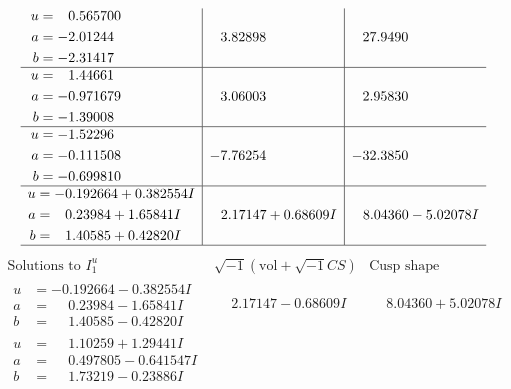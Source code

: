 \documentclass[1p]{elsarticle_modified}
\theoremstyle{definition}
\newcommand{\I}{\sqrt{-1}}
\begin{document}
$$\begin{array}{c|c|c}
\begin{aligned}
u &= \phantom{-}0.565700\phantom{ +0.000000I} \\
a &= -2.01244\phantom{ +0.000000I} \\
b &= -2.31417\phantom{ +0.000000I}\end{aligned}
 & \phantom{-}3.82898\phantom{ +0.000000I} & \phantom{-}27.9490\phantom{ +0.000000I} \\ \hline\begin{aligned}
u &= \phantom{-}1.44661\phantom{ +0.000000I} \\
a &= -0.971679\phantom{ +0.000000I} \\
b &= -1.39008\phantom{ +0.000000I}\end{aligned}
 & \phantom{-}3.06003\phantom{ +0.000000I} & \phantom{-}2.95830\phantom{ +0.000000I} \\ \hline\begin{aligned}
u &= -1.52296\phantom{ +0.000000I} \\
a &= -0.111508\phantom{ +0.000000I} \\
b &= -0.699810\phantom{ +0.000000I}\end{aligned}
 & -7.76254\phantom{ +0.000000I} & -32.3850\phantom{ +0.000000I} \\ \hline\begin{aligned}
u &= -0.192664 + 0.382554 I \\
a &= \phantom{-}0.23984 + 1.65841 I \\
b &= \phantom{-}1.40585 + 0.42820 I\end{aligned}
 & \phantom{-}2.17147 + 0.68609 I & \phantom{-}8.04360 - 5.02078 I\\
 \hline 
 \end{array}$$\newpage$$\begin{array}{c|c|c}  
\text{Solutions to }I^u_{1}& \I (\text{vol} + \sqrt{-1}CS) & \text{Cusp shape}\\
 \hline 
\begin{aligned}
u &= -0.192664 - 0.382554 I \\
a &= \phantom{-}0.23984 - 1.65841 I \\
b &= \phantom{-}1.40585 - 0.42820 I\end{aligned}
 & \phantom{-}2.17147 - 0.68609 I & \phantom{-}8.04360 + 5.02078 I \\ \hline\begin{aligned}
u &= \phantom{-}1.10259 + 1.29441 I \\
a &= \phantom{-}0.497805 - 0.641547 I \\
b &= \phantom{-}1.73219 - 0.23886 I\end{aligned}

\end{array}$$
\end{document}

